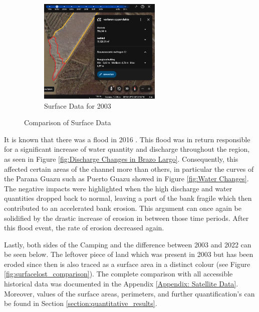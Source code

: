 \begin{figure}[H]
    \hfill
    \begin{subfigure}[b]{0.45\textwidth} %
        \includegraphics[width=\linewidth, height=5cm]{figures/appendix-g/verlorenopp2003.png}
        \caption{Surface Data for 2003}
        \label{fig:surface2003.2}
    \end{subfigure}
    \caption{Comparison of Surface Data}
    \label{fig:surface_comparison}
\end{figure}

It is known that there was a flood in 2016 \autocite{equipodemanejodeinformacionArgentinaInundaciones2016}. This flood was in return responsible for a significant increase of water quantity and discharge throughout the region, as seen in Figure \ref{fig:Discharge Changes in Brazo Largo}. Consequently, this affected certain areas of the channel more than others, in particular the curves of the Parana Guazu such as Puerto Guazu showed in Figure \ref{fig:Water Changes}. The negative impacts were highlighted when the high discharge and water quantities dropped back to normal, leaving a part of the bank fragile which then contributed to an accelerated bank erosion. This argument can once again be solidified by the drastic increase of erosion in between those time periods. After this flood event, the rate of erosion decreased again.

Lastly, both sides of the Camping and the difference between 2003 and 2022 can be seen below. The leftover piece of land which was present in 2003 but has been eroded since then is also traced as a surface area in a distinct colour (see Figure \ref{fig:surfacelost_comparison}). The complete comparison with all accessible historical data was documented in the Appendix \ref{Appendix: Satellite Data}. Moreover, values of the surface areas, perimeters, and further quantification's can be found in Section \ref{section:quantitative_results}.


